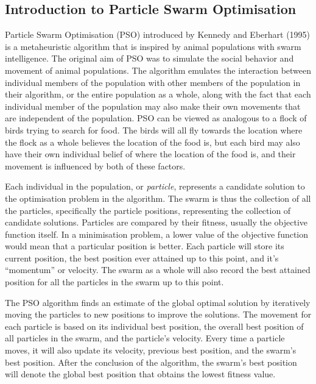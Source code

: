 \documentclass[12pt]{article}
\theoremstyle{definition}
\begin{document}
\subsection{Introduction to Particle Swarm Optimisation}
Particle Swarm Optimisation (PSO) introduced by Kennedy and Eberhart (1995) \cite{kennedy95particle} is a metaheuristic algorithm that is inspired by animal populations with swarm intelligence. The original aim of PSO was to simulate the social behavior and movement of animal populations. The algorithm emulates the interaction between individual members of the population with other members of the population in their algorithm, or the entire population as a whole, along with the fact that each individual member of the population may also make their own movements that are independent of the population. PSO can be viewed as analogous to a flock of birds trying to search for food. The birds will all fly towards the location where the flock as a whole believes the location of the food is, but each bird may also have their own individual belief of where the location of the food is, and their movement is influenced by both of these factors. \newline

Each individual in the population, or \textit{particle}, represents a candidate solution to the optimisation problem in the algorithm. The swarm is thus the collection of all the particles, specifically the particle positions, representing the collection of candidate solutions. Particles are compared by their fitness, usually the objective function itself. In a minimisation problem, a lower value of the objective function would mean that a particular position is better. Each particle will store its current position, the best position ever attained up to this point, and it's ``momentum'' or velocity. The swarm as a whole will also record the best attained position for all the particles in the swarm up to this point. \newline

The PSO algorithm finds an estimate of the global optimal solution by iteratively moving the particles to new positions to improve the solutions. The movement for each particle is based on its individual best position, the overall best position of all particles in the swarm, and the particle's velocity. Every time a particle moves, it will also update its velocity, previous best position, and the swarm's best position. After the conclusion of the algorithm, the swarm's best position will denote the global best position that obtains the lowest fitness value. \newline
\end{document}
